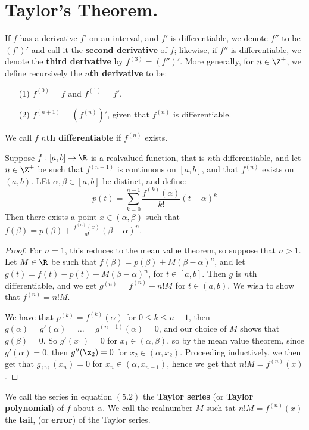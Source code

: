 
\section{Taylor's Theorem.}

\begin{definition}
    If $f$ has a derivative  $f'$ on an interval, and  $f'$ is differentiable, we
    denote $f''$ to be  $(f')'$ and call it the \textbf{second derivative} of $f$; likewise,
    if $f''$ is differentiable, we denote the \textbf{third derivative} by  $f^{(3)}=(f'')'$. More
    generally, for  $n \in \Z^+$, we define recursively the  \textbf{$n$th derivative} to be:
        \begin{enumerate}
            \item[(1)] $f^{(0)}=f$ and $f^{(1)}=f'$.

            \item[(2)] $f^{(n+1)}=(f^{(n)})'$, given that $f^{(n)}$ is differentiable.
        \end{enumerate}
        We call $f$ \textbf{$n$th differentiable} if  $f^{(n)}$ exists.
\end{definition}

\begin{theorem}\label{6.5.1}
    Suppose $f:[a,b] \rightarrow \R$ is a realvalued function, that is  $n$th differentiable, and let
    $n \in \Z^+$ be such that $f^{(n-1)}$ is continuous on  $[a,b]$, and that  $f^{(n)}$ exists on
    $(a,b)$. LEt  $\alpha, \beta \in [a,b]$ be distinct, and define:
        \begin{equation}
            p(t)=\sum_{k=0}^{n-1}{\frac{f^{(k)}(\alpha)}{k!}(t-\alpha)^k}
        \end{equation}
        Then there exists a point $x \in (\alpha, \beta)$ such that $f(\beta)=p(\beta)+\frac{f^{(n)}(x)}{n!}(\beta-\alpha)^n$.
\end{theorem}
\begin{proof}
    For $n=1$, this reduces to the mean value theorem, so suppose that  $n>1$. Let $M \in \R$ be
    such that $f(\beta)=p(\beta)+M(\beta-\alpha)^n$, and let  $g(t)=f(t)-p(t)+M(\beta-\alpha)^n$, for $t \in [a,b]$.
    Then  $g$ is  $n$th differentiable, and  we get  $g^{(n)}=f^{(n)}-n!M$ for  $t \in (a,b)$. We
    wish to show that $f^{(n)}=n!M$.

    We have that  $p^{(k)}=f^{(k)}(\alpha)$ for  $0 \leq k \leq n-1$, then  $g(\alpha)=g'(\alpha)= \dots = g^{(n-1)}(\alpha)=0$,
    and our choice of  $M$ shows that  $g(\beta)=0$. So  $g'(x_1)=0$ for $x_1 \in (\alpha,\beta)$, so by
    the mean value theorem, since $g'(\alpha)=0$, then  $g''(\x_2)=0$ for $x_2 \in (\alpha,x_2)$. Proceeding
    inductively, we then get that $g_^{(n)}(x_n)=0$ for $x_n \in (\alpha,x_{n-1})$, hence we
    get that $n!M=f^{(n)}(x)$.
\end{proof}

\begin{definition}
    We call the series in equation $(5.2)$ the \textbf{Taylor series} (or \textbf{Taylor polynomial})
    of $f$ about  $\alpha$. We call the realnumber  $M$ such tat  $n!M=f^{(n)}(x)$ the
    \textbf{tail},  (or \textbf{error}) of the Taylor series.
\end{definition}
